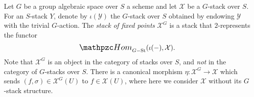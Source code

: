 \begin{definition}\label{rl-0006}
  \label{defn:romagny-fixed-stack}
  Let \(G\) be a group algebraic space over \(S\) a scheme and let \(\mathcal X\) be a \(G\)-stack over \(S\). For an \(S\)-stack \(Y\), denote by \(\iota(\mathcal Y)\) the \(G\)-stack over \(S\) obtained by endowing \(\mathcal Y\) with the trivial \(G\)-action. The \textit{stack of fixed points} \(\mathcal X^{G}\) is a stack that \(2\)-represents the functor
  \[\sHom_{G-\St}(\iota(-), \mathcal X).\]
  Note that \(\mathcal X^G\) is an object in the category of stacks over \(S\), and \textit{not} in the category of \(G\)-stacks over \(S\). There is a canonical morphism \(\eta:\mathcal X^G\to \mathcal X\) which sends \((f,\sigma)\in \mathcal X^G(U)\) to \(f\in \mathcal X(U)\), where here we consider \(\mathcal X\) without its \(G\)-stack structure. 
\end{definition}
